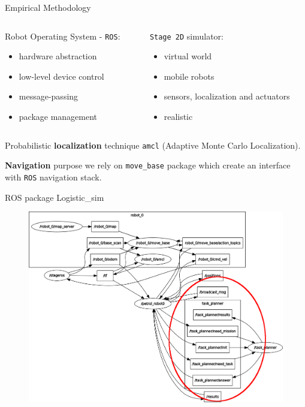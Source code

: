     \begin{frame}[fragile]{Empirical Methodology}
       
        \begin{columns}
            \begin{column}{.5\textwidth}
                Robot Operating System - \texttt{ROS}:
                \begin{itemize}
                    \item hardware abstraction 
                    \item low-level device control
                    \item message-passing
                    \item package management
                \end{itemize}
            \end{column}
            \begin{column}{.55\textwidth}
                \texttt{Stage 2D} simulator:
                \begin{itemize}
                    \item virtual world
                    \item mobile robots 
                    \item sensors, localization and actuators
                    \item realistic
                \end{itemize}
            \end{column}
        \end{columns}
        \addvspace{0.6cm}
        Probabilistic {\bf localization} technique \texttt{amcl} (Adaptive Monte Carlo Localization).
       
        {\bf Navigation} purpose we rely on \texttt{move\_base} package which create an interface with \texttt{ROS} navigation stack.
    \end{frame}

    \begin{frame}[fragile]{ROS package Logistic\_sim}
        \begin{figure}[hbt]
            \centering
            \includegraphics[scale=0.25]{img/rosgraph}
        \end{figure}
    \end{frame}



